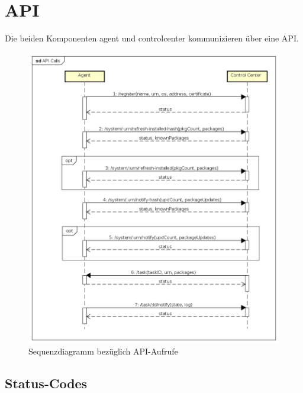 \chapter{API}

Die beiden Komponenten \gls{agent} und \gls{controlcenter} kommunizieren über eine API.


\begin{figure}
  \centering
    \includegraphics[width=\textwidth]{fig/API_Calls}
  \caption{Sequenzdiagramm bezüglich API-Aufrufe}
  \label{fig:api_sequence_diagram}
\end{figure}

\section*{Status-Codes}

